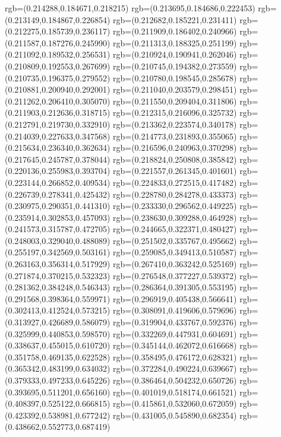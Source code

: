 {{{			rgb=(0.214288,0.184671,0.218215)
			rgb=(0.213695,0.184686,0.222453)
			rgb=(0.213149,0.184867,0.226854)
			rgb=(0.212682,0.185221,0.231411)
			rgb=(0.212275,0.185739,0.236117)
			rgb=(0.211909,0.186402,0.240966)
			rgb=(0.211587,0.187276,0.245990)
			rgb=(0.211313,0.188325,0.251199)
			rgb=(0.211092,0.189532,0.256531)
			rgb=(0.210924,0.190941,0.262046)
			rgb=(0.210809,0.192553,0.267699)
			rgb=(0.210745,0.194382,0.273559)
			rgb=(0.210735,0.196375,0.279552)
			rgb=(0.210780,0.198545,0.285678)
			rgb=(0.210881,0.200940,0.292001)
			rgb=(0.211040,0.203579,0.298451)
			rgb=(0.211262,0.206410,0.305070)
			rgb=(0.211550,0.209404,0.311806)
			rgb=(0.211903,0.212636,0.318715)
			rgb=(0.212315,0.216096,0.325732)
			rgb=(0.212791,0.219730,0.332910)
			rgb=(0.213362,0.223574,0.340178)
			rgb=(0.214039,0.227633,0.347568)
			rgb=(0.214773,0.231893,0.355065)
			rgb=(0.215634,0.236340,0.362634)
			rgb=(0.216596,0.240963,0.370298)
			rgb=(0.217645,0.245787,0.378044)
			rgb=(0.218824,0.250808,0.385842)
			rgb=(0.220136,0.255983,0.393704)
			rgb=(0.221557,0.261345,0.401601)
			rgb=(0.223144,0.266852,0.409534)
			rgb=(0.224833,0.272515,0.417482)
			rgb=(0.226739,0.278341,0.425432)
			rgb=(0.228780,0.284278,0.433373)
			rgb=(0.230975,0.290351,0.441310)
			rgb=(0.233330,0.296562,0.449225)
			rgb=(0.235914,0.302853,0.457093)
			rgb=(0.238630,0.309288,0.464928)
			rgb=(0.241573,0.315787,0.472705)
			rgb=(0.244665,0.322371,0.480427)
			rgb=(0.248003,0.329040,0.488089)
			rgb=(0.251502,0.335767,0.495662)
			rgb=(0.255197,0.342569,0.503161)
			rgb=(0.259085,0.349413,0.510587)
			rgb=(0.263163,0.356314,0.517929)
			rgb=(0.267410,0.363242,0.525169)
			rgb=(0.271874,0.370215,0.532323)
			rgb=(0.276548,0.377227,0.539372)
			rgb=(0.281362,0.384248,0.546343)
			rgb=(0.286364,0.391305,0.553195)
			rgb=(0.291568,0.398364,0.559971)
			rgb=(0.296919,0.405438,0.566641)
			rgb=(0.302413,0.412524,0.573215)
			rgb=(0.308091,0.419606,0.579696)
			rgb=(0.313927,0.426689,0.586079)
			rgb=(0.319904,0.433767,0.592376)
			rgb=(0.325999,0.440853,0.598570)
			rgb=(0.332269,0.447931,0.604691)
			rgb=(0.338637,0.455015,0.610720)
			rgb=(0.345144,0.462072,0.616668)
			rgb=(0.351758,0.469135,0.622528)
			rgb=(0.358495,0.476172,0.628321)
			rgb=(0.365342,0.483199,0.634032)
			rgb=(0.372284,0.490224,0.639667)
			rgb=(0.379333,0.497233,0.645226)
			rgb=(0.386464,0.504232,0.650726)
			rgb=(0.393695,0.511201,0.656160)
			rgb=(0.401019,0.518174,0.661521)
			rgb=(0.408397,0.525122,0.666815)
			rgb=(0.415861,0.532060,0.672059)
			rgb=(0.423392,0.538981,0.677242)
			rgb=(0.431005,0.545890,0.682354)
			rgb=(0.438662,0.552773,0.687419)
}}}
